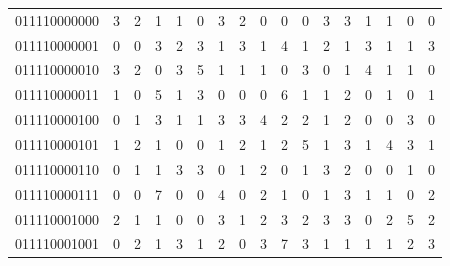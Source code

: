 \documentclass[10pt,a4paper]{article}
\begin{document}
\begin{longtable}{ |c|c|c|c|c|c|c|c|c|c|c|c|c|c|c|c|c| }
    011110000000              & 3                            & 2                                & 1                            & 1                              & 0   & 3   & 2   & 0   & 0   & 0   & 3   & 3   & 1   & 1   & 0   & 0   \\
    011110000001              & 0                            & 0                                & 3                            & 2                              & 3   & 1   & 3   & 1   & 4   & 1   & 2   & 1   & 3   & 1   & 1   & 3   \\
    011110000010              & 3                            & 2                                & 0                            & 3                              & 5   & 1   & 1   & 1   & 0   & 3   & 0   & 1   & 4   & 1   & 1   & 0   \\
    011110000011              & 1                            & 0                                & 5                            & 1                              & 3   & 0   & 0   & 0   & 6   & 1   & 1   & 2   & 0   & 1   & 0   & 1   \\
    011110000100              & 0                            & 1                                & 3                            & 1                              & 1   & 3   & 3   & 4   & 2   & 2   & 1   & 2   & 0   & 0   & 3   & 0   \\
    011110000101              & 1                            & 2                                & 1                            & 0                              & 0   & 1   & 2   & 1   & 2   & 5   & 1   & 3   & 1   & 4   & 3   & 1   \\
    011110000110              & 0                            & 1                                & 1                            & 3                              & 3   & 0   & 1   & 2   & 0   & 1   & 3   & 2   & 0   & 0   & 1   & 0   \\
    011110000111              & 0                            & 0                                & 7                            & 0                              & 0   & 4   & 0   & 2   & 1   & 0   & 1   & 3   & 1   & 1   & 0   & 2   \\
    011110001000              & 2                            & 1                                & 1                            & 0                              & 0   & 3   & 1   & 2   & 3   & 2   & 3   & 3   & 0   & 2   & 5   & 2   \\
    011110001001              & 0                            & 2                                & 1                            & 3                              & 1   & 2   & 0   & 3   & 7   & 3   & 1   & 1   & 1   & 1   & 2   & 3   \\

\end{longtable}
\end{document}
